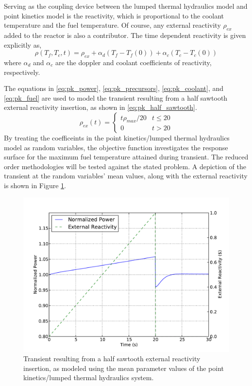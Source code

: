 Serving as the coupling device between the lumped thermal hydraulics model and point kinetics model is the reactivity, which is proportional to the coolant temperature and the fuel temperature. Of course, any external reactivity $\rho_{ex}$ added to the reactor is also a contributor. The time dependent reactivity is given explicitly as,
\begin{equation}
\label{eq:pk_reactivity}
   \rho(T_f,T_c,t) = \rho_{ex} + \alpha_d(T_f - T_f(0))
    + \alpha_c(T_c - T_c(0))
\end{equation}
where $\alpha_d$ and $\alpha_c$ are the doppler and coolant coefficients of reactivity, respectively.  

The equations in \ref{eq:pk_power}, \ref{eq:pk_precursors}, \ref{eq:pk_coolant}, and \ref{eq:pk_fuel} are used to model the transient resulting from a half sawtooth external reactivity insertion, as shown in \ref{eq:pk_half_sawtooth}. 
\begin{equation}
\label{eq:pk_half_sawtooth}
   \rho_{ex}(t) = \left\{
    \begin{array}{cr}
     t\rho_{max}/20 & t \leq 20 \\
     0                      & t > 20 
    \end{array}
    \right.
\end{equation}
By treating the coefficeints in the point kinetics/lumped thermal hydraulics model as random variables, the objective function investigates the response surface for the maximum fuel temperature attained during transient. The reduced order methodologies will be tested against the stated problem. A depiction of the transient at the random variables' mean values, along with the external reactivity is shown in Figure \ref{fig:pk_transient}.  
\begin{figure}
\caption{ \label{fig:pk_transient}
Transient resulting from a half sawtooth external reactivity insertion, as modeled using the mean parameter values of the point kinetics/lumped thermal hydraulics system.}
 \begin{center}
  \includegraphics[scale=.75]{./Chapter3/pk_power.pdf}
 \end{center}
\end{figure}
